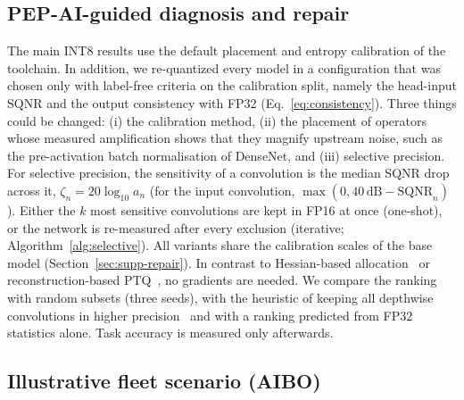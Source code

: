 \documentclass[pdflatex,sn-mathphys-num]{sn-jnl}%
\theoremstyle{thmstyleone}%
\theoremstyle{thmstyletwo}%
\theoremstyle{thmstylethree}%
\begin{document}
\subsection{PEP-AI-guided diagnosis and repair}\label{sec:selective}

The main INT8 results use the default placement and entropy calibration of the toolchain. In addition, we re-quantized every model in a configuration that was chosen only with label-free criteria on the calibration split, namely the head-input SQNR and the output consistency with FP32 (Eq.~\eqref{eq:consistency}). Three things could be changed: (i) the calibration method, (ii) the placement of operators whose measured amplification shows that they magnify upstream noise, such as the pre-activation batch normalisation of DenseNet, and (iii) selective precision. For selective precision, the sensitivity of a convolution is the median SQNR drop across it, $\zeta_n=20\log_{10}a_n$ (for the input convolution, $\max(0,40\,\mathrm{dB}-\mathrm{SQNR}_n)$). Either the $k$ most sensitive convolutions are kept in FP16 at once (one-shot), or the network is re-measured after every exclusion (iterative; Algorithm~\ref{alg:selective}). All variants share the calibration scales of the base model (Section~\ref{sec:supp-repair}). In contrast to Hessian-based allocation~\cite{dong2019hawq,yao2021hawqv3} or reconstruction-based PTQ~\cite{li2021brecq,wei2022qdrop}, no gradients are needed. We compare the ranking with random subsets (three seeds), with the heuristic of keeping all depthwise convolutions in higher precision~\cite{sheng2018quantization,nagel2019datafree} and with a ranking predicted from FP32 statistics alone. Task accuracy is measured only afterwards.

\subsection{Illustrative fleet scenario (AIBO)}\label{sec:aibo}
\end{document}
